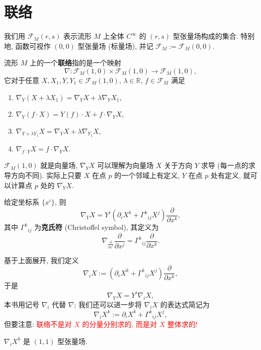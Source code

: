\section{联络}
\label{connection}
我们用 $\mathcal{F}_M(r,s)$ 表示流形 $M$ 上全体 $C^\infty$ 的 $(r,s)$ 型张量场构成的集合. 特别地, 函数可视作 $(0,0)$ 型张量场 (标量场), 并记 $\mathcal{F}_M:=\mathcal{F}_M(0,0)$.
\begin{definition}[向量场的联络]
	流形 $M$ 上的一个{\bf 联络}指的是一个映射 
	\[\nabla:\mathcal{F}_M(1,0)\times\mathcal{F}_M(1,0)\to \mathcal{F}_M(1,0),\] 
	它对于任意 $X,X_1,Y,Y_1\in\mathcal{F}_M(1,0)$, $\lambda\in\mathbb{R}$, $f\in\mathcal{F}_M$ 满足
	\begin{enumerate}
		\item $\nabla_Y(X+\lambda X_1)=\nabla_YX+\lambda \nabla_YX_1$,
		\item $\nabla_Y(f\cdot X)=Y(f)\cdot X+f\cdot \nabla_YX$,
		\item $\nabla_{Y+\lambda Y_1}X=\nabla_YX+\lambda\nabla_{Y_1}X$,
		\item $\nabla_{f\cdot Y}X=f\cdot\nabla_YX$.
	\end{enumerate}
\end{definition}
\begin{remark}
	$\mathcal{F}_M(1,0)$ 就是向量场, $\nabla_YX$ 可以理解为向量场 $X$ 关于方向 $Y$ 求导 (每一点的求导方向不同). 实际上只要 $X$ 在点 $p$ 的一个邻域上有定义, $Y$ 在点 $p$ 处有定义, 就可以计算点 $p$ 处的 $\nabla_YX$.
\end{remark}
\begin{theorem}
	给定坐标系 $\{x^i\}$, 则
	\[ \nabla_Y X=Y^i(\partial_i X^k+\Gamma^{k}{}_{ij}X^{j})\frac{\partial }{\partial x^k}, \]
	其中 $\Gamma^{k}{}_{ij}$ 为{\bf 克氏符} (Christoffel symbol), 其定义为
	$$ \nabla_{\frac{\partial }{\partial x^i}}\frac{\partial }{\partial x^j}=\Gamma^{k}{}_{ij}\frac{\partial }{\partial x^k}. $$
\end{theorem}
基于上面展开, 我们定义
\[ \nabla_iX:=(\partial_iX^k+\Gamma^{k}{}_{ij}X^j)\frac{\partial }{\partial x^k}, \] 
于是
\[ \nabla_YX=Y^i\nabla_iX, \] 
本书用记号 $\nabla_i$ 代替 $\nabla$; 我们还可以进一步将 $\nabla_iX$ 的表达式简记为
\[ \nabla_iX^k:=\partial_iX^k+\Gamma^{k}{}_{ij}X^j, \]
但要注意: \textcolor{red}{联络不是对 $X$ 的分量分别求的, 而是对 $X$ 整体求的!}

\begin{remark}
	$\nabla_i X^k$ 是 $(1,1)$ 型张量场.
\end{remark}

